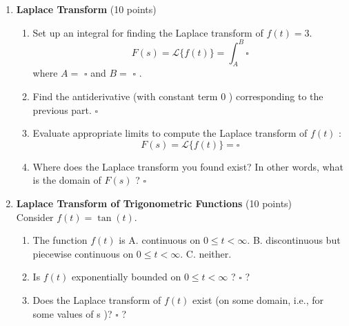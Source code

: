 \begin{enumerate}
  \item \textbf{Laplace Transform} (10 points)\\
  \begin{enumerate}[label=\alph*]
    \item Set up an integral for finding the Laplace transform of $f(t)=3$.
    $$
    F(s)=\mathcal{L}\{f(t)\}=\int_A^B \square
    $$
    where $A=$ $\square$ and $B=$ $\square$ .
    \begin{subanswer}
    \end{subanswer}
    \item Find the antiderivative (with constant term 0 ) corresponding to the previous part.
    $\square$
    \begin{subanswer}
    \end{subanswer}
    \item Evaluate appropriate limits to compute the Laplace transform of $f(t)$ :
    $$
    F(s)=\mathcal{L}\{f(t)\}=\square
    $$
    \begin{subanswer}
    \end{subanswer}
    \item Where does the Laplace transform you found exist? In other words, what is the domain of $F(s)$ ?
    $\square$
    \begin{subanswer}
    \end{subanswer}
  \end{enumerate}

  \item \textbf{Laplace Transform of Trigonometric Functions} (10 points)\\
  Consider $f(t)=\tan (t)$.
  \begin{enumerate}[label=\alph*]
    \item The function $f(t)$ is
    A. continuous on $0 \leq t<\infty$.
    B. discontinuous but piecewise continuous on $0 \leq t<\infty$.
    C. neither.
    \begin{subanswer}
    \end{subanswer}
    \item Is $f(t)$ exponentially bounded on $0 \leq t<\infty$ ? $\square$ ?
    \begin{subanswer}
    \end{subanswer}
    \item Does the Laplace transform of $f(t)$ exist (on some domain, i.e., for some values of s )? $\square$ ?
    \begin{subanswer}
    \end{subanswer}
  \end{enumerate}


\end{enumerate}
